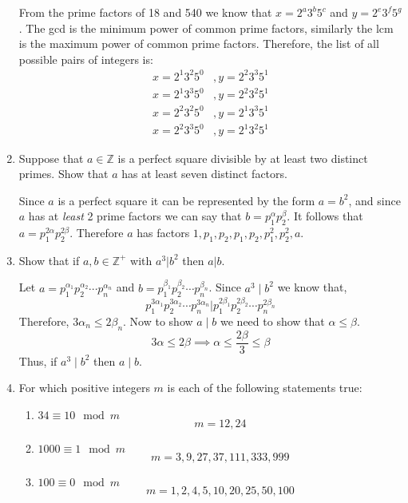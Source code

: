 \documentclass[class=article, crop=false]{standalone}
\def\integers{{\mathbb Z}}
\begin{document}
\begin{enumerate}
  From the prime factors of 18 and 540 we know that $x = 2^a 3^b 5^c$ and $y = 2^e 3^f 5^g$. The gcd is the
  minimum power of common prime factors, similarly the lcm is the maximum power of common prime factors. Therefore,
  the list of all possible pairs of integers is:
  \begin{align*}
	x=2^1 3^2 5^0 &, y=2^2 3^3 5^1 \\
	x=2^1 3^3 5^0 &, y=2^2 3^2 5^1 \\
	x=2^2 3^2 5^0 &, y=2^1 3^3 5^1 \\
	x=2^2 3^3 5^0 &, y=2^1 3^2 5^1
  \end{align*}

\item
  Suppose that $a\in\integers$ is a perfect square
  divisible by at least two distinct primes.
  Show that $a$ has at least seven distinct factors.

  Since $a$ is a perfect square it can be represented by the form $a=b^2$, and since $a$ has 
  at \emph{least} 2 prime factors we can say that $b=p_1^{\alpha} p_2^{\beta}$. 
  It follows that $a=p_1^{2\alpha} p_2^{2\beta}$. Therefore $a$ has factors
  $1, p_1, p_2, p_1, p_2, p_1^2, p_2^2, a$.

\item
  Show that if $a,b\in\integers^+$ with $a^3\big|b^2$ then $a\big|b$.

  Let $a= p_1^{\alpha_1} p_2^{\alpha_2}\cdots p_n^{\alpha_n}$ and $b= p_1^{\beta_1} p_2^{\beta_2}\cdots p_n^{\beta_n}$.
  Since $a^3\mid b^2$ we know that, 
  $$p_1^{3\alpha_1} p_2^{3\alpha_2}\cdots p_n^{3\alpha_n} \Big| p_1^{2\beta_1} p_2^{2\beta_2}\cdots p_n^{2\beta_n}$$
  Therefore, $3\alpha_n \leq 2\beta_n$. Now to show $a\mid b$ we need to show that $\alpha \leq \beta$.
  $$3\alpha\leq 2\beta \implies \alpha \leq \frac{2\beta}{3} \leq \beta$$
  Thus, if $a^3\mid b^2$ then $a\mid b$.

\item For which positive integers $m$ is each of the following statements true:
\begin{enumerate}
\item
  $34\equiv 10 \mod m$ \\
  $$m = 12, 24$$
\item
  $1000\equiv 1 \mod m$ \\
  $$m = 3, 9, 27, 37, 111, 333, 999$$
\item
  $100\equiv 0 \mod m$ \\
  $$m = 1, 2, 4, 5, 10, 20, 25, 50, 100$$
\end{enumerate}

\end{enumerate}
\end{document}
